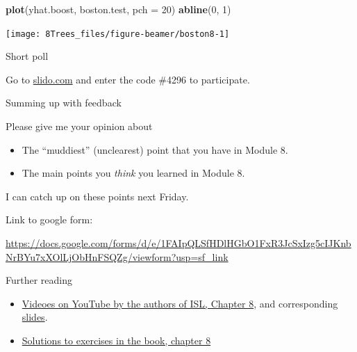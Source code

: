 \documentclass[10pt,ignorenonframetext,]{beamer}
\newenvironment{Shaded}{\begin{snugshade}}{\end{snugshade}}
\newcommand{\KeywordTok}[1]{\textcolor[rgb]{0.13,0.29,0.53}{\textbf{#1}}}
\newcommand{\DataTypeTok}[1]{\textcolor[rgb]{0.13,0.29,0.53}{#1}}
\newcommand{\DecValTok}[1]{\textcolor[rgb]{0.00,0.00,0.81}{#1}}
\newcommand{\NormalTok}[1]{#1}
\begin{document}
\begin{frame}[fragile]

\scriptsize

\begin{Shaded}
\begin{Highlighting}[]
\KeywordTok{plot}\NormalTok{(yhat.boost, boston.test, }\DataTypeTok{pch =} \DecValTok{20}\NormalTok{)}
\KeywordTok{abline}\NormalTok{(}\DecValTok{0}\NormalTok{, }\DecValTok{1}\NormalTok{)}
\end{Highlighting}
\end{Shaded}

\begin{center}\texttt{[image: 8Trees\_files/figure-beamer/boston8-1]} \end{center}

\end{frame}

\begin{frame}{Short poll}

Go to \href{http://www.slido.com}{slido.com} and enter the code \#4296
to participate.

\end{frame}

\begin{frame}{Summing up with feedback}

Please give me your opinion about

\begin{itemize}
\item
  The ``muddiest'' (unclearest) point that you have in Module 8.
\item
  The main points you \emph{think} you learned in Module 8.
\end{itemize}

I can catch up on these points next Friday.

Link to google form:

\url{https://docs.google.com/forms/d/e/1FAIpQLSfHDlHGbO1FxR3JcSxIzg5cIJKnbNrBYu7xXOlLjObHnFSQZg/viewform?usp=sf_link}

\end{frame}

\begin{frame}{Further reading}

\begin{itemize}
\item
  \href{https://www.youtube.com/playlist?list=PL5-da3qGB5IB23TLuA8ZgVGC8hV8ZAdGh}{Videoes
  on YouTube by the authors of ISL, Chapter 8}, and corresponding
  \href{https://lagunita.stanford.edu/c4x/HumanitiesScience/StatLearning/asset/trees.pdf}{slides}.
\item
  \href{https://rstudio-pubs-static.s3.amazonaws.com/65564_925dfde884e14ef9b5735eddd16c263e.html}{Solutions
  to exercises in the book, chapter 8}
\end{itemize}

\end{frame}
\end{document}
